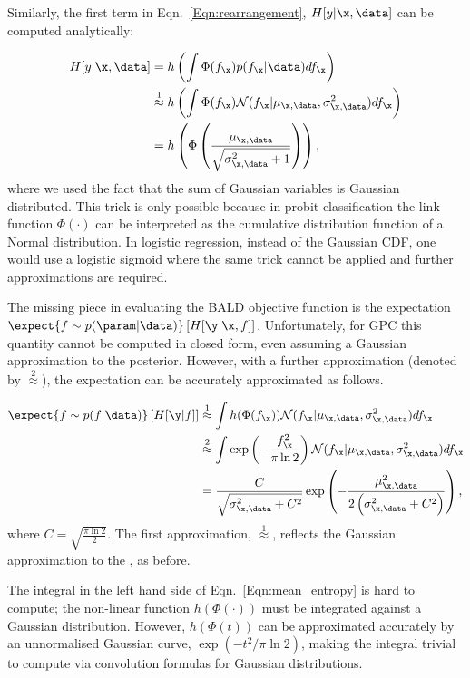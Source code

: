 Similarly, the first term in Eqn.\ \eqref{Eqn:rearrangement}, $H[y\vert\x,\data]$ can be computed analytically:

\begin{align}
	H[y\vert\x,\data] &= h\left( \int \Phi( f_{\x} ) p(f_{\x}\vert\data) df_{\x} \right)\\
	&\stackrel{1}{\approx} h\left( \int \Phi( f_{\x} )  \mathcal{N}(f_{\x}\vert \mu_{\x,\data},\sigma_{\x,\data}^2) df_{\x} \right) \\
	&= h \left( \Phi\left( \frac{\mu_{\x,\data}}{\sqrt{\sigma^2_{\x,\data} + 1}} \right)\right)\label{ent_mean},
\end{align}
where we used the fact that the sum of Gaussian variables is Gaussian distributed. This trick is only possible because in probit classification the link function $\Phi(\cdot)$ can be interpreted as the cumulative distribution function of a Normal distribution. In logistic regression, instead of the Gaussian CDF, one would use a logistic sigmoid where the same trick cannot be applied and further approximations are required.

The missing piece in evaluating the BALD objective function is the expectation $\expect{f\sim p(\param|\data)} \left[ H[\y \vert \x,f] \right]$. Unfortunately, for GPC this quantity cannot be computed in closed form, even assuming a Gaussian approximation to the posterior. However, with a further approximation (denoted by $\stackrel{2}{\approx}$), the expectation can be accurately approximated as follows.

\begin{align}
	\expect{f \sim p(f\vert\data)} \left[ H[\y\vert f] \right] &\stackrel{1}{\approx}\int h(\Phi(f_{\x})) \mathcal{N}(f_{\x}\vert \mu_{\x,\data},\sigma_{\x,\data}^2)df_{\x}\label{Eqn:mean_entropy}\\
	&\stackrel{2}{\approx} \int \exp\left(-\frac{f_{\x}^2}{\pi\ln2}\right) \mathcal{N}(f_{\x}\vert \mu_{\x,\data},\sigma_{\x,\data}^2)df_{\x}\\	
	&= \frac{C}{\sqrt{\sigma_{\x,\data}^2 + C^2}}\exp\left(-\frac{\mu_{\x,\data}^2}{2\left(\sigma_{\x,\data}^2 + C^2\right)}\right),
\end{align}
where $C=\sqrt{\frac{\pi\ln2}{2}}$. The first approximation, {\scriptsize $\stackrel{1}{\approx}$}, reflects the Gaussian approximation to the , as before.

The integral in the left hand side of Eqn.\ \eqref{Eqn:mean_entropy} is hard to compute; the non-linear function $h(\Phi(\cdot))$ must be integrated against a Gaussian distribution. However, $h(\Phi(t))$ can be approximated accurately by an unnormalised Gaussian curve, $\exp(-t^2/\pi\ln2)$, making the integral trivial to compute via convolution formulas for Gaussian distributions.

